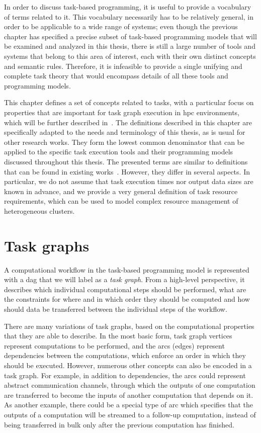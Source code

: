 In order to discuss task-based programming, it is useful to provide a vocabulary of terms related
to it. This vocabulary necessarily has to be relatively general, in order to be applicable to a
wide range of systems; even though the previous chapter has specified a precise subset of
task-based programming models that will be examined and analyzed in this thesis, there is still a
large number of tools and systems that belong to this area of interest, each with their own
distinct concepts and semantic rules. Therefore, it is infeasible to provide a single unifying and
complete task theory that would encompass details of all these tools and programming models.

This chapter defines a set of concepts related to tasks, with a particular focus on properties that
are important for task graph execution in \gls{hpc} environments, which will be
further described in~. The definitions described in this chapter are
specifically adapted to the needs and terminology of this thesis, as is usual for other research
works. They form the lowest common denominator that can be applied to the specific task execution
tools and their programming models discussed throughout this thesis. The presented terms are
similar to definitions that can be found in existing works~\cite{task_scheduling,hagras2003static,wang2018list}. However, they
differ in several aspects. In particular, we do not assume that task execution times nor output
data sizes are known in advance, and we provide a very general definition of task resource
requirements, which can be used to model complex resource management of heterogeneous clusters.

\section{Task graphs}
\label{sec:task-graphs}
A computational workflow in the task-based programming model is represented with a
\gls{dag} that we will label as a \emph{task graph}. From a high-level
perspective, it describes which individual computational steps should be performed, what are the
constraints for where and in which order they should be computed and how should data be transferred
between the individual steps of the workflow.

There are many variations of task graphs, based on the computational properties that they are able
to describe. In the most basic form, task graph vertices represent computations to be performed,
and the arcs (edges) represent dependencies between the computations, which enforce an order in
which they should be executed. However, numerous other concepts can also be encoded in a task
graph. For example, in addition to dependencies, the arcs could represent abstract communication
channels, through which the outputs of one computation are transferred to become the inputs of
another computation that depends on it. As another example, there could be a special type of arc
which specifies that the outputs of a computation will be streamed to a follow-up computation,
instead of being transferred in bulk only after the previous computation has finished.

